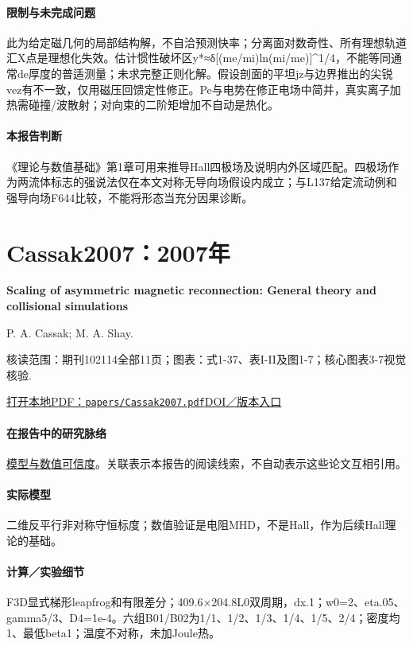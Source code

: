 \documentclass[UTF8,a4paper,11pt,openany,fontset=fandol]{ctexbook}
\begin{document}
\paragraph{限制与未完成问题}此为给定磁几何的局部结构解，不自洽预测快率；分离面对数奇性、所有理想轨道汇X点是理想化失效。估计惯性破坏区y*≈δ[(me/mi)ln(mi/me)]\textasciicircum{}1/4，不能等同通常de厚度的普适测量；未求完整正则化解。假设剖面的平坦jz与边界推出的尖锐vez有不一致，仅用磁压回馈定性修正。Pe与电势在修正电场中简并，真实离子加热需碰撞/波散射；对向束的二阶矩增加不自动是热化。

\paragraph{本报告判断}《理论与数值基础》第1章可用来推导Hall四极场及说明内外区域匹配。四极场作为两流体标志的强说法仅在本文对称无导向场假设内成立；与L137给定流动例和强导向场F644比较，不能将形态当充分因果诊断。

\section{Cassak2007：2007年}\label{paper:Cassak2007}

\textbf{Scaling of asymmetric magnetic reconnection: General theory and collisional simulations}\citep{Cassak2007}\

P. A. Cassak;  M. A. Shay.

\textsf{核读范围：}期刊102114全部11页；\textsf{图表：}式1-37、表I-II及图1-7；核心图表3-7视觉核验.

\href{run:../papers/Cassak2007.pdf}{打开本地PDF：\texttt{papers/Cassak2007.pdf}}\quad\href{https://doi.org/10.1063/1.2795630}{DOI／版本入口}

\paragraph{在报告中的研究脉络}\hyperref[V1-ch:numerics]{模型与数值可信度}。关联表示本报告的阅读线索，不自动表示这些论文互相引用。

\paragraph{实际模型}二维反平行非对称守恒标度；数值验证是电阻MHD，不是Hall，作为后续Hall理论的基础。

\paragraph{计算／实验细节}F3D显式梯形leapfrog和有限差分；409.6×204.8L0双周期，dx.1；w0=2、eta.05、gamma5/3、D4=1e-4。六组B01/B02为1/1、1/2、1/3、1/4、1/5、2/4；密度均1、最低beta1；温度不对称，未加Joule热。
\end{document}

